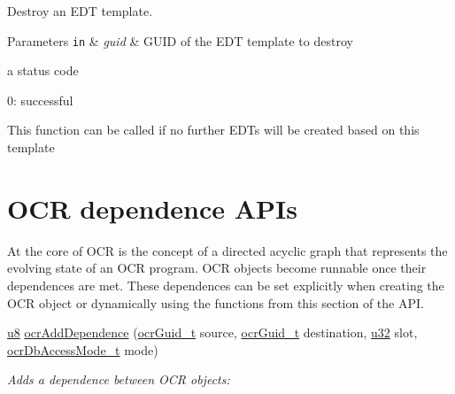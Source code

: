 Destroy an E\-D\-T template. 


\begin{DoxyParams}[1]{Parameters}
\mbox{\tt in}  & {\em guid} & G\-U\-I\-D of the E\-D\-T template to destroy \\
\hline
\end{DoxyParams}

\returns
a status code
\begin{DoxyItemize}
\item 0\-: successful 
\end{DoxyItemize}

\descr
This function can be called if no further E\-D\-Ts will be created based on this template



\hypertarget{group__OCRDependences}{\section{O\-C\-R dependence A\-P\-Is}
\label{group__OCRDependences}
}

At the core of OCR is the concept of a directed acyclic graph that represents the evolving
state of an OCR program.   OCR objects become runnable once their dependences are met.
These dependences can be set explicitly when creating the OCR object or dynamically using the functions
from this section of the API.   


\begin{DoxyCompactItemize}
\item 
\hyperlink{group__OCRTypesGeneral_ga92c50087ca0e64fa93fc59402c55f8ca}{u8} \hyperlink{group__OCRDependences_gab0eea439797c1dcde2dbbe704d701dcd}
{ocr\-Add\-Dependence} (\hyperlink{group__OCRTypesGeneral_gacde3883d1ce245c051133c2c3aa82fc8}{ocr\-Guid\-\_\-t} source, \hyperlink{group__OCRTypesGeneral_gacde3883d1ce245c051133c2c3aa82fc8}{ocr\-Guid\-\_\-t} destination, \hyperlink{group__OCRTypesGeneral_gafaa62991928fb9fb18ff0db62a040aba}{u32} slot, \hyperlink{group__OCRTypesDB_gae72c588a0182fcee7db295e53743821a}{ocr\-Db\-Access\-Mode\-\_\-t} mode)
\begin{DoxyCompactList}\small\item\em Adds a dependence between O\-C\-R objects\-: \end{DoxyCompactList}
\end{DoxyCompactItemize}

